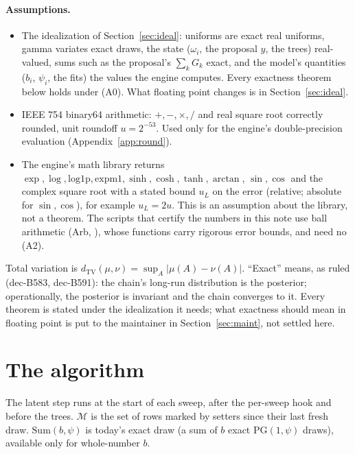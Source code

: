 \documentclass[11pt]{article}
\theoremstyle{definition}
\newcommand{\PG}{\mathrm{PG}}
\newcommand{\TV}{d_{\mathrm{TV}}}
\begin{document}
\paragraph{Assumptions.}
\begin{itemize}
\item[(A0)] The idealization of Section~\ref{sec:ideal}: uniforms are exact real uniforms, gamma variates exact
draws, the state ($\omega_i$, the proposal $y$, the trees) real-valued, sums such as the proposal's
$\sum_kG_k$ exact, and the model's quantities ($b_i$, $\psi_i$, the fits) the values the engine computes. Every
exactness theorem below holds under (A0). What floating point changes is in Section~\ref{sec:ideal}.
\item[(A1)] IEEE 754 binary64 arithmetic: $+,-,\times,/$ and real square root correctly rounded, unit roundoff
$u=2^{-53}$. Used only for the engine's double-precision evaluation (Appendix~\ref{app:round}).
\item[(A2)] The engine's math library returns $\exp,\log,\mathrm{log1p},\mathrm{expm1},\sinh,\cosh,\tanh,\arctan$,
$\sin,\cos$ and the complex square root with a stated bound $u_L$ on the error (relative; absolute for $\sin,\cos$),
for example $u_L=2u$. This is an assumption about the library, not a theorem. The scripts that certify the numbers
in this note use ball arithmetic (Arb, \cite{arb}), whose functions carry rigorous error bounds, and need no
(A2).
\end{itemize}
Total variation is $\TV(\mu,\nu)=\sup_A|\mu(A)-\nu(A)|$. ``Exact'' means, as ruled (dec-B583, dec-B591): the
chain's long-run distribution is the posterior; operationally, the posterior is invariant and the chain converges
to it. Every theorem is stated under the idealization it needs; what exactness should mean in floating point is
put to the maintainer in Section~\ref{sec:maint}, not settled here.

\section{The algorithm}\label{sec:alg}

The latent step runs at the start of each sweep, after the per-sweep hook and before the trees. $\mathcal M$ is
the set of rows marked by setters since their last fresh draw. $\mathrm{Sum}(b,\psi)$ is today's exact draw (a sum
of $b$ exact $\PG(1,\psi)$ draws), available only for whole-number $b$.
\end{document}
